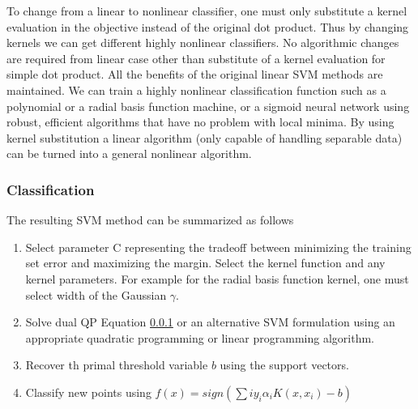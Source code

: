 To change from a linear to nonlinear classifier, one must only substitute a kernel evaluation in the objective instead of the original dot product. Thus by changing kernels we can get different highly nonlinear classifiers. No algorithmic changes are required from linear case other than substitute of a kernel evaluation for simple dot product. All the benefits of the original linear SVM methods are maintained. We can train a highly nonlinear classification function such as a polynomial or a radial basis function machine, or a sigmoid neural network using robust, efficient algorithms that have no problem with local minima. By using kernel substitution a linear algorithm (only capable of handling separable data) can be turned into a general nonlinear algorithm. 
 
\subsubsection{Classification}
The resulting SVM method can be summarized as follows 
\begin{enumerate}
	\item Select parameter C representing the tradeoff between minimizing the training set error and maximizing the margin. Select the kernel function and any kernel parameters. For example for the radial basis function kernel, one must select width of the Gaussian $\gamma$. 
	\item Solve dual QP Equation \ref{} or an alternative SVM formulation using an appropriate quadratic programming or linear programming algorithm. 
	\item Recover th primal threshold variable $b$ using the support vectors. 
	\item Classify new points using $f(x)=sign\left(\sum{i}y_i\alpha_i K\left(x,x_i\right)-b\right)$
\end{enumerate}

